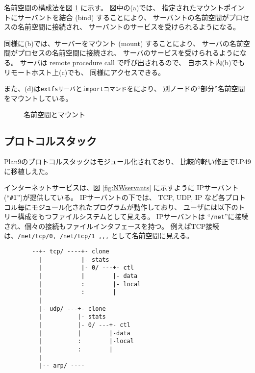 \documentclass{ipsjpapers}
\begin{document}
名前空間の構成法を図 \ref{fig:NSmount} に示す。
図中の(a)では、
指定されたマウントポイントにサーバントを結合 (bind) することにより、
サーバントの名前空間がプロセスの名前空間に接続され、
サーバントのサービスを受けられるようになる。

同様に(b)では、サーバーをマウント (mount) することにより、
サーバの名前空間がプロセスの名前空間に接続され、  
サーバのサービスを受けられるようになる。    
サーバは remote procedure call で呼び出されるので、
自ホスト内(b)でもリモートホスト上(c)でも、
同様にアクセスできる。

また、(d)は{\tt extfsサーバ}と{\tt importコマンド}をにより、
別ノードの``部分''名前空間をマウントしている。

\begin{figure}[htb]
  \begin{center}
   \epsfxsize=340pt
    \caption{名前空間とマウント}
    \label{fig:NSmount}
  \end{center}
\end{figure}


\subsection{プロトコルスタック}

  Plan9のプロトコルスタックはモジュール化されており、
  比較的軽い修正でLP49 に移植しえた。

  インターネットサービスは、図 \ref{fig:NWservants} に示すように
  IPサーバント(``{\tt \#I}'')が提供している。
  IPサーバントの下では、
  TCP, UDP, IP など各プロトコル毎にモジュール化されたプログラムが動作しており、
  ユーザには以下のトリー構成をもつファイルシステムとして見える。
  IPサーバントは ``{\tt /net}''に接続され、個々の接続もファイルインタフェースを持つ。
  例えばTCP接続は、{\tt /net/tcp/0, /net/tcp/1 ,,,} として名前空間に見える。


{\footnotesize
\begin{verbatim}
        --+- tcp/ ----+- clone                        
          |           |- stats                
          |           |- 0/ ---+- ctl          
          |           |        |- data     
          |           :        |- local    
          |           :        |           
          |                               
          |- udp/ ---+- clone                        
          |          |- stats                  
          |          |- 0/ ---+- ctl            
          |          |        |-data     
          |          :        |-local    
          |          :        |           
          |                                              
          |-- arp/ ----
\end{verbatim}
}
\end{document}
